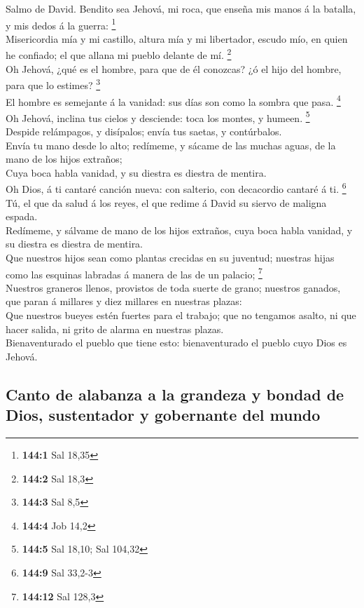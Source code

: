  Salmo de David. Bendito sea Jehová, mi roca, que enseña mis
manos á la batalla, y mis dedos á la guerra: \footnote{\textbf{144:1}
  Sal 18,35}\\
 Misericordia mía y mi castillo, altura mía y mi libertador,
escudo mío, en quien he confiado; el que allana mi pueblo delante de mí.
\footnote{\textbf{144:2} Sal 18,3}\\
 Oh Jehová, ¿qué es el hombre, para que de él conozcas? ¿ó
el hijo del hombre, para que lo estimes? \footnote{\textbf{144:3} Sal
  8,5}\\
 El hombre es semejante á la vanidad: sus días son como la
sombra que pasa. \footnote{\textbf{144:4} Job 14,2}\\
 Oh Jehová, inclina tus cielos y desciende: toca los montes,
y humeen. \footnote{\textbf{144:5} Sal 18,10; Sal 104,32}\\
 Despide relámpagos, y disípalos; envía tus saetas, y
contúrbalos.\\
 Envía tu mano desde lo alto; redímeme, y sácame de las
muchas aguas, de la mano de los hijos extraños;\\
 Cuya boca habla vanidad, y su diestra es diestra de
mentira.\\
 Oh Dios, á ti cantaré canción nueva: con salterio, con
decacordio cantaré á ti. \footnote{\textbf{144:9} Sal 33,2-3}\\
 Tú, el que da salud á los reyes, el que redime á David su
siervo de maligna espada.\\
 Redímeme, y sálvame de mano de los hijos extraños, cuya
boca habla vanidad, y su diestra es diestra de mentira.\\
 Que nuestros hijos sean como plantas crecidas en su
juventud; nuestras hijas como las esquinas labradas á manera de las de
un palacio; \footnote{\textbf{144:12} Sal 128,3}\\
 Nuestros graneros llenos, provistos de toda suerte de
grano; nuestros ganados, que paran á millares y diez millares en
nuestras plazas:\\
 Que nuestros bueyes estén fuertes para el trabajo; que no
tengamos asalto, ni que hacer salida, ni grito de alarma en nuestras
plazas.\\
 Bienaventurado el pueblo que tiene esto: bienaventurado el
pueblo cuyo Dios es Jehová.

\hypertarget{canto-de-alabanza-a-la-grandeza-y-bondad-de-dios-sustentador-y-gobernante-del-mundo}{%
\subsection{Canto de alabanza a la grandeza y bondad de Dios,
sustentador y gobernante del
mundo}\label{canto-de-alabanza-a-la-grandeza-y-bondad-de-dios-sustentador-y-gobernante-del-mundo}}

